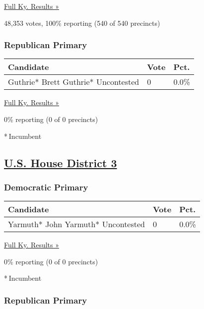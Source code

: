 \href{https://www.nytimes3xbfgragh.onion/elections/results/kentucky}{Full
Ky. Results »}

48,353 votes, 100\% reporting (540 of 540 precincts)

\hypertarget{republican-primary-1}{%
\subsubsection{Republican Primary}\label{republican-primary-1}}

\begin{longtable}[]{@{}lll@{}}
\toprule
Candidate & Vote & Pct.\tabularnewline
\midrule
\endhead
 Guthrie* Brett Guthrie* Uncontested & 0 & 0.0\%\tabularnewline
\bottomrule
\end{longtable}

\href{https://www.nytimes3xbfgragh.onion/elections/results/kentucky}{Full
Ky. Results »}

0\% reporting (0 of 0 precincts)

* Incumbent

\hypertarget{us-house-district-3}{%
\subsection{\texorpdfstring{\href{https://www.nytimes3xbfgragh.onion/elections/results/kentucky-house-district-3-primary-election}{U.S.
House District 3}}{U.S. House District 3}}\label{us-house-district-3}}

\hypertarget{democratic-primary-2}{%
\subsubsection{Democratic Primary}\label{democratic-primary-2}}

\begin{longtable}[]{@{}lll@{}}
\toprule
Candidate & Vote & Pct.\tabularnewline
\midrule
\endhead
 Yarmuth* John Yarmuth* Uncontested & 0 & 0.0\%\tabularnewline
\bottomrule
\end{longtable}

\href{https://www.nytimes3xbfgragh.onion/elections/results/kentucky}{Full
Ky. Results »}

0\% reporting (0 of 0 precincts)

* Incumbent

\hypertarget{republican-primary-2}{%
\subsubsection{Republican Primary}\label{republican-primary-2}}

